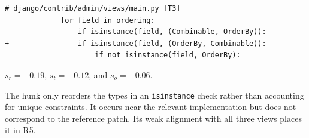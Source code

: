 \begin{lstlisting}
# django/contrib/admin/views/main.py [T3]
             for field in ordering:
-                if isinstance(field, (Combinable, OrderBy)):
+                if isinstance(field, (OrderBy, Combinable)):
                     if not isinstance(field, OrderBy):
\end{lstlisting}

\noindent
$s_r=-0.19$, $s_t=-0.12$, and $s_o=-0.06$.

The hunk only reorders the types in an \texttt{isinstance} check rather than accounting for unique constraints. It occurs near the relevant implementation but does not correspond to the reference patch. Its weak alignment with all three views places it in R5.
